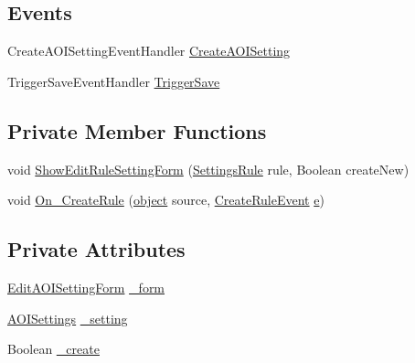 \subsection*{Events}
\begin{DoxyCompactItemize}
\item 
Create\+A\+O\+I\+Setting\+Event\+Handler \hyperlink{class_web_analyzer_1_1_u_i_1_1_interaction_objects_1_1_a_o_i_setting_control_a655f9d463578bed0ae1ce3243eee82c0}{Create\+A\+O\+I\+Setting}
\item 
Trigger\+Save\+Event\+Handler \hyperlink{class_web_analyzer_1_1_u_i_1_1_interaction_objects_1_1_a_o_i_setting_control_a752fb801d539bc3df62f41bb854074e2}{Trigger\+Save}
\end{DoxyCompactItemize}
\subsection*{Private Member Functions}
\begin{DoxyCompactItemize}
\item 
void \hyperlink{class_web_analyzer_1_1_u_i_1_1_interaction_objects_1_1_a_o_i_setting_control_ae24e397e2156f90970cd5d74b8fde800}{Show\+Edit\+Rule\+Setting\+Form} (\hyperlink{class_web_analyzer_1_1_models_1_1_settings_model_1_1_settings_rule}{Settings\+Rule} rule, Boolean create\+New)
\item 
void \hyperlink{class_web_analyzer_1_1_u_i_1_1_interaction_objects_1_1_a_o_i_setting_control_ac465620c69a2312ef3a901e95890c2ca}{On\+\_\+\+Create\+Rule} (\hyperlink{_u_i_2_h_t_m_l_resources_2js_2lib_2underscore_8min_8js_aae18b7515bb2bc4137586506e7c0c903}{object} source, \hyperlink{class_web_analyzer_1_1_events_1_1_create_rule_event}{Create\+Rule\+Event} \hyperlink{_u_i_2_h_t_m_l_resources_2js_2lib_2bootstrap_8min_8js_ab5902775854a8b8440bcd25e0fe1c120}{e})
\end{DoxyCompactItemize}
\subsection*{Private Attributes}
\begin{DoxyCompactItemize}
\item 
\hyperlink{class_web_analyzer_1_1_u_i_1_1_edit_a_o_i_setting_form}{Edit\+A\+O\+I\+Setting\+Form} \hyperlink{class_web_analyzer_1_1_u_i_1_1_interaction_objects_1_1_a_o_i_setting_control_ac5dbfb65b9f423acacde7281bd52dfa2}{\+\_\+form}
\item 
\hyperlink{class_web_analyzer_1_1_models_1_1_settings_model_1_1_a_o_i_settings}{A\+O\+I\+Settings} \hyperlink{class_web_analyzer_1_1_u_i_1_1_interaction_objects_1_1_a_o_i_setting_control_a99ecb89643396f52452299c28f5836f6}{\+\_\+setting}
\item 
Boolean \hyperlink{class_web_analyzer_1_1_u_i_1_1_interaction_objects_1_1_a_o_i_setting_control_ae07b626b4714865d3312bff419277857}{\+\_\+create}
\end{DoxyCompactItemize}
